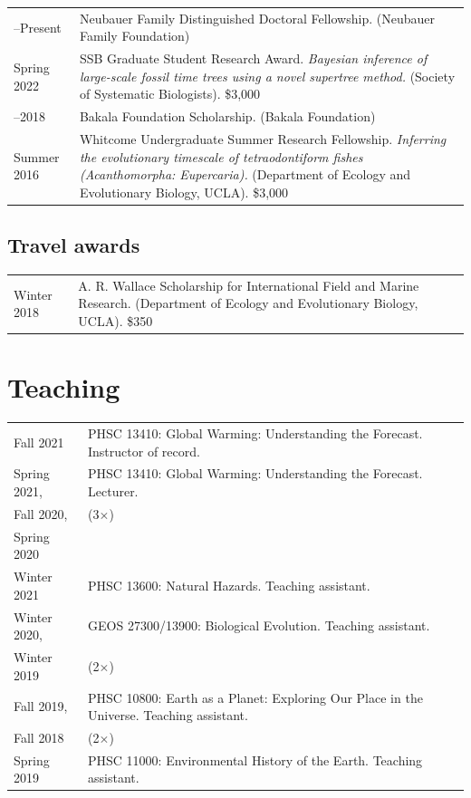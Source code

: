 \documentclass[10pt]{article}
\begin{document}
\begin{tabularx}{\textwidth}{>{\raggedleft\arraybackslash}p{2.2cm} X}
2018--Present & Neubauer Family Distinguished Doctoral Fellowship. (Neubauer Family Foundation) \\[0.1cm]
Spring 2022 & SSB Graduate Student Research Award. \textit{Bayesian inference of large-scale fossil time trees using a novel supertree method.} (Society of Systematic Biologists). \$3,000 \\[0.55cm]
2014--2018 & Bakala Foundation Scholarship. (Bakala Foundation) \\[0.1cm]
Summer 2016 & Whitcome Undergraduate Summer Research Fellowship. \textit{Inferring the evolutionary timescale of tetraodontiform fishes (Acanthomorpha: Eupercaria).} (Department of Ecology and Evolutionary Biology, UCLA). \$3,000
\end{tabularx}

\subsection*{Travel awards}

\begin{tabularx}{\textwidth}{>{\raggedleft\arraybackslash}p{2.2cm} X}
Winter 2018 & A. R. Wallace Scholarship for International Field and Marine Research. (Department of Ecology and Evolutionary Biology, UCLA). \$350
\end{tabularx}

\section*{Teaching}

\begin{tabularx}{\textwidth}{>{\raggedleft\arraybackslash}p{2.2cm} X}
Fall 2021 & PHSC 13410: Global Warming: Understanding the Forecast. Instructor of record. \\[0.1cm]
Spring 2021, & PHSC 13410: Global Warming: Understanding the Forecast. Lecturer. \\
Fall 2020, & (3$\times$) \\
Spring 2020 & \\[0.1cm]
Winter 2021 & PHSC 13600: Natural Hazards. Teaching assistant. \\[0.1cm]
Winter 2020, & GEOS 27300/13900: Biological Evolution. Teaching assistant. \\
Winter 2019 & (2$\times$) \\[0.1cm]
Fall 2019, & PHSC 10800: Earth as a Planet: Exploring Our Place in the Universe. Teaching assistant. \\
Fall 2018 & (2$\times$) \\[0.1cm]
Spring 2019 & PHSC 11000: Environmental History of the Earth. Teaching assistant.
\end{tabularx}
\end{document}
